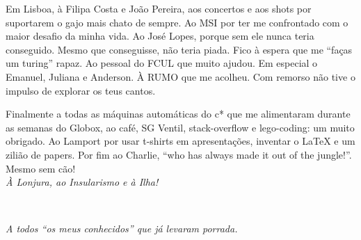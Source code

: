 
Em Lisboa, à Filipa Costa e João Pereira, aos concertos e aos shots por suportarem o gajo mais chato de sempre. 
Ao MSI por ter me confrontado  com o maior desafio da minha vida. 
Ao José Lopes, porque sem ele nunca teria conseguido. Mesmo que conseguisse, não teria piada. Fico à espera que me ``faças um turing'' rapaz. 
Ao pessoal do FCUL que muito ajudou. Em especial o Emanuel, Juliana e Anderson. 
À RUMO que me acolheu. Com remorso não tive o impulso de explorar os teus cantos. 

Finalmente a todas as máquinas automáticas do c* que me alimentaram durante as semanas do Globox, ao café, SG Ventil, stack-overflow e lego-coding: um muito obrigado. Ao Lamport por usar t-shirts em apresentações, inventar o LaTeX e um zilião de papers. 
Por fim ao Charlie, ``who has always made it out of the jungle!''. Mesmo sem cão!\\ 

\emph{À Lonjura, ao Insularismo e  à Ilha!} \\



\LIMPA
\LIMPA

~
\vfill

\begin{flushright}\textit{A todos ``os meus conhecidos''  que já levaram porrada. }\end{flushright}

\LIMPA

